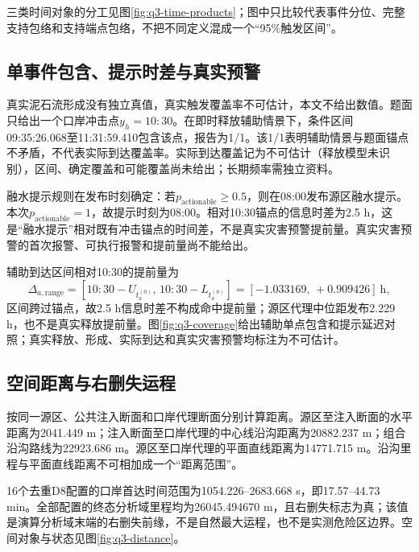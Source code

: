 三类时间对象的分工见图\ref{fig:q3-time-products}；图中只比较代表事件分位、完整支持包络和支持端点包络，不把不同定义混成一个“95\%触发区间”。


\subsection{单事件包含、提示时差与真实预警}
真实泥石流形成没有独立真值，真实触发覆盖率不可估计，本文不给出数值。题面只给出一个口岸冲击点$y_h=10{:}30$。在即时释放辅助情景下，条件区间09:35:26.068至11:31:59.410包含该点，报告为1/1。该1/1表明辅助情景与题面锚点不矛盾，不代表实际到达覆盖率。实际到达覆盖记为不可估计（释放模型未识别），区间、确定覆盖和可能覆盖尚未给出；长期频率需独立资料。

融水提示规则在发布时刻确定：若$p_{\mathrm{actionable}}\ge0.5$，则在08:00发布源区融水提示。本次$p_{\mathrm{actionable}}=1$，故提示时刻为08:00。相对10:30锚点的信息时差为2.5 h，这是“融水提示”相对既有冲击锚点的时间差，不是真实灾害预警提前量。真实灾害预警的首次报警、可执行报警和提前量尚不能给出。

辅助到达区间相对10:30的提前量为
\begin{equation}
\Delta_{a,\mathrm{range}}
=[10{:}30-U_{t_a^{(0)}},\,10{:}30-L_{t_a^{(0)}}]
=[-1.033169,\,+0.909426]\ \mathrm{h},
\end{equation}
区间跨过锚点，故2.5 h信息时差不构成命中提前量；源区代理中位距发布2.229 h，也不是真实释放提前量。图\ref{fig:q3-coverage}给出辅助单点包含和提示延迟对照；真实释放、形成、实际到达和真实灾害预警均标注为不可估计。


\subsection{空间距离与右删失运程}
按同一源区、公共注入断面和口岸代理断面分别计算距离。源区至注入断面的水平距离为2041.449 m；注入断面至口岸代理的中心线沿沟距离为20882.237 m；组合沿沟路线为22923.686 m。源区至口岸代理的平面直线距离为14771.715 m。沿沟里程与平面直线距离不可相加成一个“距离范围”。

16个去重D8配置的口岸首达时间范围为1054.226--2683.668 s，即17.57--44.73 min。全部配置的终态分析域里程均为26045.494670 m，且右删失标志为真；该值是演算分析域末端的右删失前缘，不是自然最大运程，也不是实测危险区边界。空间对象与状态见图\ref{fig:q3-distance}。


